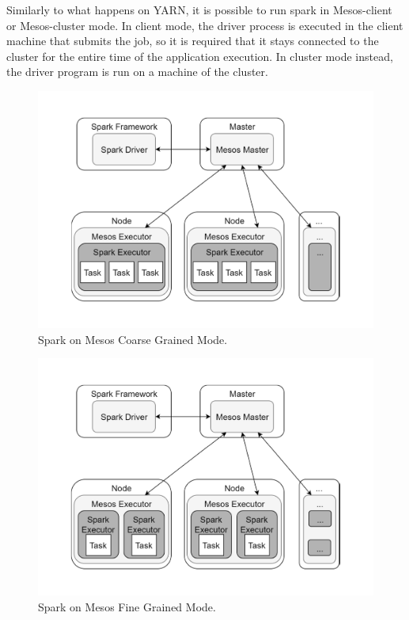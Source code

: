 Similarly to what happens on YARN, it is possible to run spark in Mesos-client or Mesos-cluster mode. In client mode, the driver process
is executed in the client machine that submits the job, so it is required that it stays connected to the cluster for the entire time of the application execution. In cluster mode instead, the driver program is run on a machine of the cluster.
\begin{figure}
	\vspace{-1cm}
	\centering
	\includegraphics[width=\columnwidth]{Images/spark_mesos_coarse_grained_mode.pdf}  
	\vspace{-1cm}
	\caption[Spark on Mesos Coarse Grained Mode]{Spark on Mesos Coarse Grained Mode.}
	\label{fig:sparkOnMesosCoarseGrainedMode}
\end{figure}
\begin{figure}
	\vspace{-1cm}
	\centering
	\includegraphics[width=\columnwidth]{Images/spark_mesos_fine_grained_mode.pdf}  
	\vspace{-1cm}
	\caption[Spark on Mesos Fine Grained Mode]{Spark on Mesos Fine Grained Mode.}
	\label{fig:sparkOnMesosFineGrainedMode}
\end{figure}

